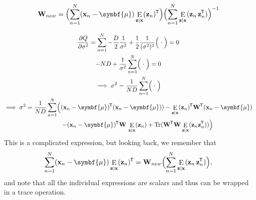 \documentclass[11pt]{article}
\DeclareMathOperator{\E}{E}
\DeclareMathOperator{\Tr}{Tr}
\newcommand{\xb}{\mathbf{x}}
\newcommand{\zb}{\mathbf{z}}
\newcommand{\ub}{\symbf{\mu}}
\newcommand{\Wb}{\mathbf{W}}
\newcommand*{\tran}{^{\mkern-1.5mu\mathsf{T}}}
\begin{document}
\begin{framed}
  \begin{equation}
    \Wb_{new} = \Bigl(\sum_{n=1}^N (\xb_n - \ub) \E_{\zb\mid\xb}(\zb_n) \tran \Bigr)
    \Bigl(\sum_{n=1}^N \E_{\zb\mid\xb}(\zb_n\, \zb_n\tran) \Bigr)^{-1}
  \end{equation}
\end{framed}
\begin{gather*}
  \frac{\partial Q}{\partial \sigma^2} =
  \sum_{n=1}^N -\frac{D}{2}\frac{1}{\sigma^2}
    + \frac{1}{2} \frac{1}{(\sigma^2)^2}
  \Bigl( \; \cdot \; \Bigr) = 0 \\
  -N D + \frac{1}{\sigma^2} \sum_{n=1}^N \Bigl( \; \cdot \; \Bigr) = 0 \\
  \implies  \sigma^2 = \frac{1}{N D} \sum_{n=1}^N \Bigl( \; \cdot \; \Bigr) \\
  \implies \sigma^2 = \frac{1}{N D} \sum_{n=1}^N
    \Bigl((\xb_n - \ub)\tran(\xb_n - \ub))
    -\E_{\zb\mid\xb}(\zb_n)\tran \Wb\tran (\xb_n - \ub) \\
  \quad \qquad  -(\xb_n - \ub)\tran \Wb\, \E_{\zb\mid\xb}(\zb_n)
    +\Tr(\Wb\tran \Wb\E_{\zb\mid\xb}(\zb_n \zb_n\tran))\Bigr)
\end{gather*}
This is a complicated expression, but looking back, we remember that
\begin{equation*}
  \sum_{n=1}^N (\xb_n - \ub) \E_{\zb\mid\xb}(\zb_n) \tran =
  \Wb_{new} \Bigl(\sum_{n=1}^N \E_{\zb\mid\xb}(\zb_n\, \zb_n\tran) \Bigr),
\end{equation*}
and note that all the individual expressions are scalars and thus can be wrapped
in a trace operation.
\end{document}
